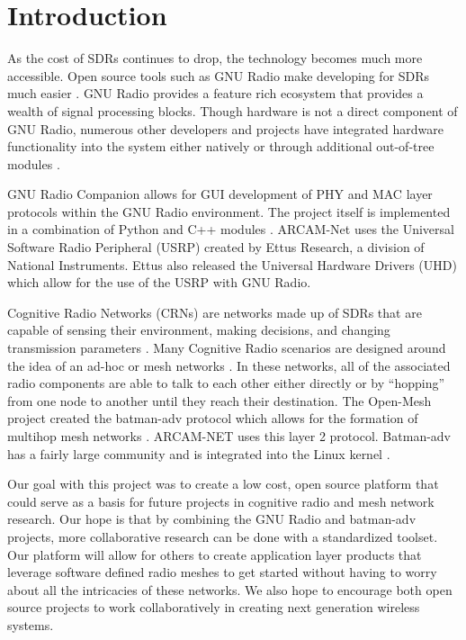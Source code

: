 \section{Introduction}

As the cost of SDRs continues to drop, the technology becomes much more accessible. Open source tools such as GNU Radio make developing for SDRs much easier \cite{0003}. GNU Radio provides a feature rich ecosystem that provides a wealth of signal processing blocks. Though hardware is not a direct component of GNU Radio, numerous other developers and projects have integrated hardware functionality into the system either natively or through additional out-of-tree modules \cite{0004} \cite{0005}.

GNU Radio Companion allows for GUI development of PHY and MAC layer protocols within the GNU Radio environment. The project itself is implemented in a combination of Python and C++ modules \cite{0003}. ARCAM-Net uses the Universal Software Radio Peripheral (USRP) created by Ettus Research, a division of National Instruments\cite{0006}. Ettus also released the Universal Hardware Drivers (UHD) \cite{0007} which allow for the use of the USRP with GNU Radio.   

Cognitive Radio Networks (CRNs) are networks made up of SDRs that are capable of sensing their environment, making decisions, and changing transmission parameters \cite{Akyildiz2007921}. Many Cognitive Radio scenarios are designed around the idea of an ad-hoc or mesh networks \cite{Akyildiz2009810}. In these networks, all of the associated radio components are able to talk to each other either directly or by ``hopping'' from one node to another until they reach their destination. The Open-Mesh project created the batman-adv protocol which allows for the formation of multihop mesh networks \cite{0008}. ARCAM-NET uses this layer 2 protocol. Batman-adv has a fairly large community and is integrated into the Linux kernel \cite{0008}. 

Our goal with this project was to create a low cost, open source platform that could serve as a basis for future projects in cognitive radio and mesh network research. Our hope is that by combining the GNU Radio and batman-adv projects, more collaborative research can be done with a standardized toolset. Our platform will allow for others to create application layer products that leverage software defined radio meshes to get started without having to worry about all the intricacies of these networks. We also hope to encourage both open source projects to work collaboratively in creating next generation wireless systems. 
